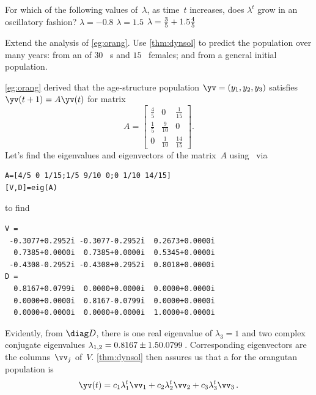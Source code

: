 \begin{activity}
For which of the following values of~\(\lambda\), as time~\(t\) increases, does \(\lambda^t\) grow in an oscillatory fashion?
{\(\lambda=-0.8\)}
{\(\lambda=1.5\)}
{\(\lambda=\frac35+1.5\frac45\)}
\end{activity}




\begin{example} \label{eg:orangs}
Extend the  analysis of \cref{eg:orang}. 
Use \cref{thm:dynsol} to predict the population over many years: from an  of \(30\)~ s and \(15\)~ females; and from a general initial population.
\begin{solution} 
\cref{eg:orang} derived that the age-structure population \(\yv=(y_1,y_2,y_3)\) satisfies \(\yv(t+1)=A\yv(t)\) for matrix
\begin{equation*}
A=\begin{bmatrix} \frac45&0&\frac1{15}
\\\frac15&\frac9{10}&0
\\0&\frac1{10}&\frac{14}{15} \end{bmatrix}.
\end{equation*}
Let's find the eigenvalues and eigenvectors of the matrix~\(A\) using \script\ via
\begin{verbatim}
A=[4/5 0 1/15;1/5 9/10 0;0 1/10 14/15]
[V,D]=eig(A)
\end{verbatim}
\setbox\ajrqrbox\hbox{}%
\marginajrbox%
to find
\begin{verbatim}
V =
 -0.3077+0.2952i -0.3077-0.2952i  0.2673+0.0000i
  0.7385+0.0000i  0.7385+0.0000i  0.5345+0.0000i
 -0.4308-0.2952i -0.4308+0.2952i  0.8018+0.0000i
D =
  0.8167+0.0799i  0.0000+0.0000i  0.0000+0.0000i
  0.0000+0.0000i  0.8167-0.0799i  0.0000+0.0000i
  0.0000+0.0000i  0.0000+0.0000i  1.0000+0.0000i
\end{verbatim}
Evidently, from \(\diag D\), there is one real eigenvalue of \(\lambda_3=1\) and two complex conjugate eigenvalues \(\lambda_{1,2}=0.8167\pm 1.50.0799\)\,.
Corresponding eigenvectors are the columns~\(\vv_j\) of~\(V\).
\cref{thm:dynsol} then assures us that a  for the orangutan population is
\begin{equation*}
\yv(t)=c_1\lambda_1^t\vv_1+c_2\lambda_2^t\vv_2+c_3\lambda_3^t\vv_3\,.

\end{equation*}
\end{solution}
\end{example}

